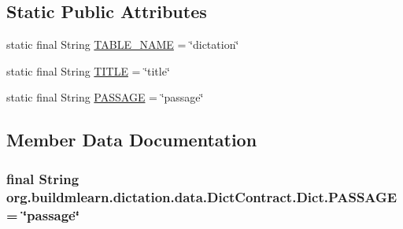 \subsection*{Static Public Attributes}
\begin{DoxyCompactItemize}
\item 
static final String \hyperlink{classorg_1_1buildmlearn_1_1dictation_1_1data_1_1DictContract_1_1Dict_a4a69132c90438c3b5d3f188a1789b6f4}{T\+A\+B\+L\+E\+\_\+\+N\+A\+ME} = \char`\"{}dictation\char`\"{}
\item 
static final String \hyperlink{classorg_1_1buildmlearn_1_1dictation_1_1data_1_1DictContract_1_1Dict_a16257378409fa6ad58eb9b75dfb4d685}{T\+I\+T\+LE} = \char`\"{}title\char`\"{}
\item 
static final String \hyperlink{classorg_1_1buildmlearn_1_1dictation_1_1data_1_1DictContract_1_1Dict_aee689ee49fd3786540df6cb7fb44a9af}{P\+A\+S\+S\+A\+GE} = \char`\"{}passage\char`\"{}
\end{DoxyCompactItemize}


\subsection{Member Data Documentation}
\subsubsection[{\texorpdfstring{P\+A\+S\+S\+A\+GE}{PASSAGE}}]{\setlength{\rightskip}{0pt plus 5cm}final String org.\+buildmlearn.\+dictation.\+data.\+Dict\+Contract.\+Dict.\+P\+A\+S\+S\+A\+GE = \char`\"{}passage\char`\"{}\hspace{0.3cm}{\ttfamily [static]}}\hypertarget{classorg_1_1buildmlearn_1_1dictation_1_1data_1_1DictContract_1_1Dict_aee689ee49fd3786540df6cb7fb44a9af}{}\label{classorg_1_1buildmlearn_1_1dictation_1_1data_1_1DictContract_1_1Dict_aee689ee49fd3786540df6cb7fb44a9af}
